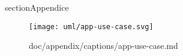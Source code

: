section{Appendice}

\begin{figure}[H]
    \centering
    \texttt{[image: uml/app-use-case.svg]}
    \caption{doc/appendix/captions/app-use-case.md}
    \label{fig:app-use-case}
\end{figure}


